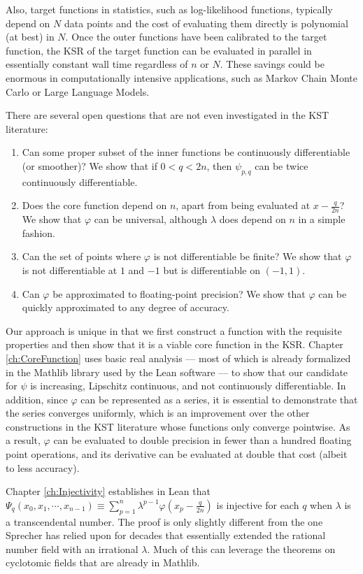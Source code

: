 Also, target functions in statistics, such as log-likelihood functions, typically depend on $N$ data points and the cost of evaluating them directly is polynomial (at best) in $N$. Once the outer functions have been calibrated to the target function, the KSR of the target function can be evaluated in parallel in essentially constant wall time regardless of $n$ or $N$. These savings could be enormous in computationally intensive applications, such as Markov Chain Monte Carlo or Large Language Models.

There are several open questions that are not even investigated in the KST literature:
\begin{enumerate}
    \item Can some proper subset of the inner functions be continuously differentiable (or smoother)? We show that if $0 < q < 2n$, then $\psi_{p,q}$ can be twice continuously differentiable.
    \item Does the core function depend on $n$, apart from being evaluated at $x - \frac{q}{2n}$? We show that $\varphi$ can be universal, although $\lambda$ does depend on $n$ in a simple fashion.    
    \item Can the set of points where $\varphi$ is not differentiable be finite? We show that $\varphi$ is not differentiable at $1$ and $-1$ but is differentiable on $\left(-1,1\right)$.
    \item Can $\varphi$ be approximated to floating-point precision? We show that $\varphi$ can be quickly approximated to any degree of accuracy. 
\end{enumerate}

Our approach is unique in that we first construct a function with the requisite properties and then show that it is a viable core function in the KSR. Chapter \ref{ch:CoreFunction} uses basic real analysis --- most of which is already formalized in the Mathlib library used by the Lean software --- to show that our candidate for $\psi$ is increasing, Lipschitz continuous, and not continuously differentiable. In addition, since $\varphi$ can be represented as a series, it is essential to demonstrate that the series converges uniformly, which is an improvement over the other constructions in the KST literature whose functions only converge pointwise. As a result, $\varphi$ can be evaluated to double precision in fewer than a hundred floating point operations, and its derivative can be evaluated at double that cost (albeit to less accuracy).

Chapter \ref{ch:Injectivity} establishes in Lean that $\Psi_q\left(x_0, x_1, \cdots, x_{n - 1}\right) \equiv \sum\limits_{p = 1}^n \lambda^{p -1} \varphi\left(x_p - \frac{q}{2n}\right)$ is injective for each $q$ when $\lambda$ is a transcendental number. The proof is only slightly different from the one Sprecher has relied upon for decades that essentially extended the rational number field with an irrational $\lambda$. Much of this can leverage the theorems on cyclotomic fields that are already in Mathlib.

